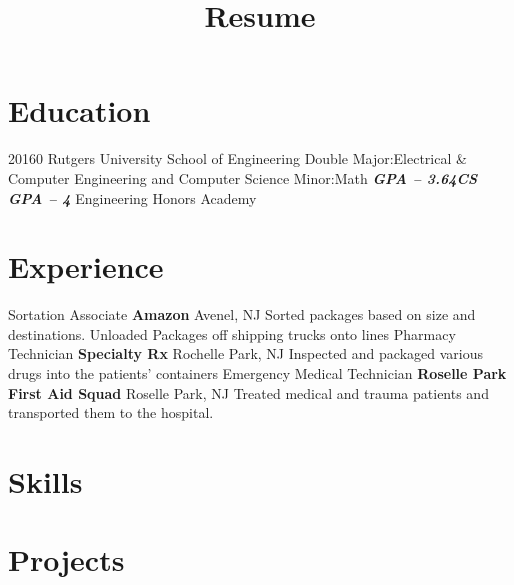 \documentclass[11pt,letterpaper]{moderncv}
\title{Resume}
\begin{document}
\makecvtitle
\section{Education}

\tlcventry
{2016}{0}
{Rutgers University \- School of Engineering}
{\newline Double Major:Electrical \& Computer Engineering and Computer Science \newline Minor:Math}
{\textit \textbf{{GPA -- 3.64}}}{\textit \textbf{{CS GPA -- 4}}}
{Engineering Honors Academy}  

\section{Experience}

{Sortation Associate}
{\textbf{Amazon}}
{Avenel, NJ}{}
{Sorted packages based on size and destinations. Unloaded Packages off shipping trucks onto lines
}
{Pharmacy Technician}
{\textbf{Specialty Rx}}
{Rochelle Park, NJ}{}
{Inspected and packaged various drugs into the patients' containers
}
{Emergency Medical Technician}
{\textbf{Roselle Park First Aid Squad}}
{Roselle Park, NJ}{}
{Treated medical and trauma patients and transported them to the hospital.
}
\section{Skills}



\section{Projects}







\end{document}
